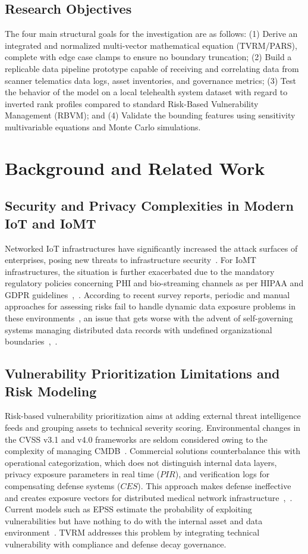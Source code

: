\documentclass[conference,a4paper]{IEEEtran}
\begin{document}
\subsection{Research Objectives}
The four main structural goals for the investigation are as follows: (1) Derive an integrated and normalized multi-vector mathematical equation (TVRM/PARS), complete with edge case clamps to ensure no boundary truncation; (2) Build a replicable data pipeline prototype capable of receiving and correlating data from scanner telematics data logs, asset inventories, and governance metrics; (3) Test the behavior of the model on a local telehealth system dataset with regard to inverted rank profiles compared to standard Risk-Based Vulnerability Management (RBVM); and (4) Validate the bounding features using sensitivity multivariable equations and Monte Carlo simulations.

\section{Background and Related Work}
\subsection{Security and Privacy Complexities in Modern IoT and IoMT}
Networked IoT infrastructures have significantly increased the attack surfaces of enterprises, posing new threats to infrastructure security~\cite{b1}. For IoMT infrastructures, the situation is further exacerbated due to the mandatory regulatory policies concerning PHI and bio-streaming channels as per HIPAA and GDPR guidelines~\cite{b14},~\cite{b15}. According to recent survey reports, periodic and manual approaches for assessing risks fail to handle dynamic data exposure problems in these environments~\cite{b2}, an issue that gets worse with the advent of self-governing systems managing distributed data records with undefined organizational boundaries~\cite{b5},~\cite{b8}.

\subsection{Vulnerability Prioritization Limitations and Risk Modeling}
Risk-based vulnerability prioritization aims at adding external threat intelligence feeds and grouping assets to technical severity scoring. Environmental changes in the CVSS v3.1 and v4.0 frameworks are seldom considered owing to the complexity of managing CMDB~\cite{b9}. Commercial solutions counterbalance this with operational categorization, which does not distinguish internal data layers, privacy exposure parameters in real time ($PIR$), and verification logs for compensating defense systems ($CES$). This approach makes defense ineffective and creates exposure vectors for distributed medical network infrastructure~\cite{b4},~\cite{b18}. Current models such as EPSS estimate the probability of exploiting vulnerabilities but have nothing to do with the internal asset and data environment~\cite{b16}. TVRM addresses this problem by integrating technical vulnerability with compliance and defense decay governance.
\end{document}
